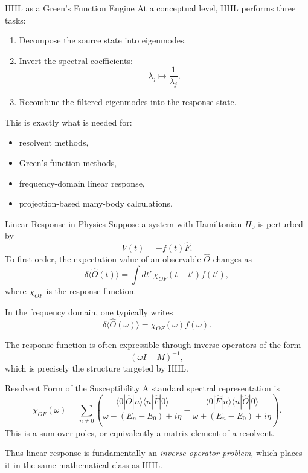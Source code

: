 \documentclass{beamer}
\begin{document}

\begin{frame}{HHL as a Green's Function Engine}
  At a conceptual level, HHL performs three tasks:
  \begin{enumerate}
  \item Decompose the source state into eigenmodes.
  \item Invert the spectral coefficients:
    \[
    \lambda_j \mapsto \frac{1}{\lambda_j}.
    \]
  \item Recombine the filtered eigenmodes into the response state.
  \end{enumerate}

  This is exactly what is needed for:
  \begin{itemize}
  \item resolvent methods,
  \item Green's function methods,
  \item frequency-domain linear response,
  \item projection-based many-body calculations.
  \end{itemize}
\end{frame}


\begin{frame}{Linear Response in Physics}
  Suppose a system with Hamiltonian \(H_0\) is perturbed by
  \[
  V(t) = - f(t)\hat{F}.
  \]
  To first order, the expectation value of an observable \(\hat{O}\) changes as
  \[
  \delta \langle \hat{O}(t) \rangle
  =
  \int dt' \, \chi_{OF}(t-t') f(t'),
  \]
  where \(\chi_{OF}\) is the response function.

  In the frequency domain, one typically writes
  \[
  \delta \langle \hat{O}(\omega)\rangle
  =
  \chi_{OF}(\omega) f(\omega).
  \]

  The response function is often expressible through inverse operators of the form
  \[
  (\omega I - M)^{-1},
  \]
  which is precisely the structure targeted by HHL.
\end{frame}


\begin{frame}{Resolvent Form of the Susceptibility}
  A standard spectral representation is
  \[
  \chi_{OF}(\omega)
  =
  \sum_{n\neq 0}
  \left(
  \frac{\langle 0|\hat{O}|n\rangle \langle n|\hat{F}|0\rangle}
       {\omega-(E_n-E_0)+i\eta}
       -
       \frac{\langle 0|\hat{F}|n\rangle \langle n|\hat{O}|0\rangle}
            {\omega+(E_n-E_0)+i\eta}
            \right).
            \]
            This is a sum over poles, or equivalently a matrix element of a resolvent.

            Thus linear response is fundamentally an \emph{inverse-operator problem}, which places it in the same mathematical class as HHL.
\end{frame}
\end{document}
